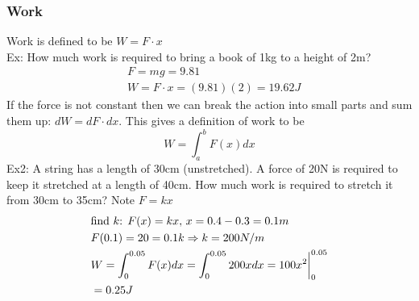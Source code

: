 \documentclass[11pt, fleqn]{article}
\begin{document}
\subsubsection{Work}
Work is defined to be $W=F\cdot x$\\
Ex: How much work is required to bring a book of 1kg to a height of 2m?
\begin{align*}
    &F=mg=9.81\\
    &W=F\cdot x=(9.81)(2)=19.62J
\end{align*}
If the force is not constant then we can break the action into small parts and sum them up: $dW=dF\cdot dx$. This gives a definition of work to be
$$W=\int_a^bF(x)dx$$
Ex2: A string has a length of 30cm (unstretched). A force of 20N is required to keep it stretched at a length of 40cm. How much work is required to stretch it from 30cm to 35cm? Note $F=kx$
\begin{align*}
    &\text{find $k$: }F(x)=kx,\,x=0.4-0.3=0.1m\\
    &F(0.1)=20=0.1k\Rightarrow k=200N/m\\
    &W=\int_0^{0.05}F(x)dx=\int_0^{0.05}200xdx={100x^2}\bigg\vert_0^{0.05}\\
    &=0.25J
\end{align*}
\end{document}
